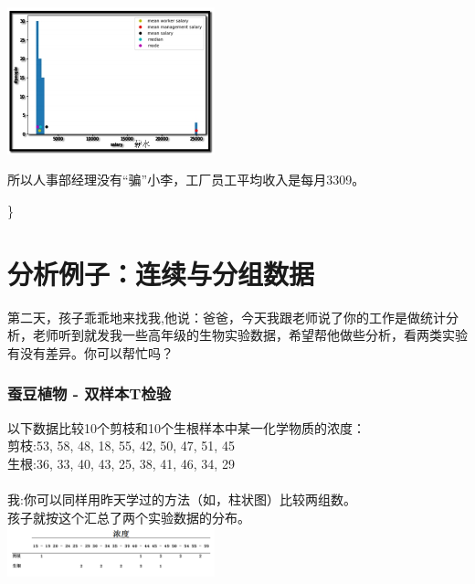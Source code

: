 
\includegraphics[width=6cm]{AverageSalaryScreenshot_2021-07-31_1715021.jpg}

所以人事部经理没有``骗''小李，工厂员工平均收入是每月3309。

\textbar{}\}

\hypertarget{ux5206ux6790ux4f8bux5b50ux8fdeux7eedux4e0eux5206ux7ec4ux6570ux636e}{%
\section{分析例子：连续与分组数据}\label{ux5206ux6790ux4f8bux5b50ux8fdeux7eedux4e0eux5206ux7ec4ux6570ux636e}}

第二天，孩子乖乖地来找我,他说：爸爸，今天我跟老师说了你的工作是做统计分析，老师听到就发我一些高年级的生物实验数据，希望帮他做些分析，看两类实验有没有差异。你可以帮忙吗？\\

\hypertarget{ux8695ux8c46ux690dux7269---ux53ccux6837ux672ctux68c0ux9a8c}{%
\subsubsection{蚕豆植物 -
双样本T检验}\label{ux8695ux8c46ux690dux7269---ux53ccux6837ux672ctux68c0ux9a8c}}

以下数据比较10个剪枝和10个生根样本中某一化学物质的浓度：\\
剪枝:53, 58, 48, 18, 55, 42, 50, 47, 51, 45\\
生根:36, 33, 40, 43, 25, 38, 41, 46, 34, 29\\
~\\
我:你可以同样用昨天学过的方法（如，柱状图）比较两组数。\\
孩子就按这个汇总了两个实验数据的分布。\\

\includegraphics[width=6cm]{图片61-11.png}


